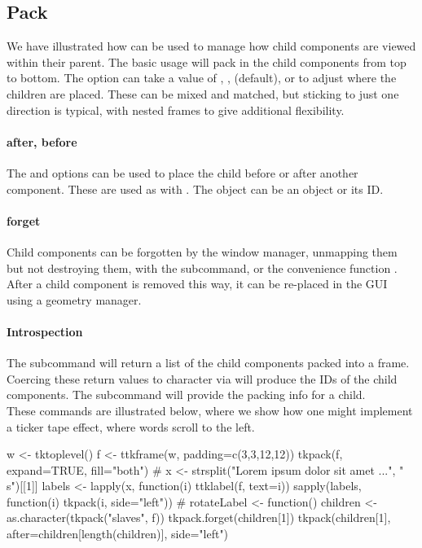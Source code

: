 \subsection{Pack}
\label{sec:tcltk:pack}


We have illustrated how  can be used to manage how
child components are viewed within their parent. The basic usage
 will pack in the child components from top to
bottom. The  option can take a value of
, ,  (default), or 
to adjust where the children are placed. These can be mixed and
matched, but sticking to just one direction is typical, with nested
frames to give additional flexibility.

\paragraph{after, before}
The  and  options can be
used to place the child before or after another component. These are
used as with . The object
 can be an \R\/ object or its ID. 


\paragraph{forget}
Child components can be forgotten by the window manager, unmapping
them but not destroying them, with the 
subcommand, or the convenience function
. After a child component is removed this way,
it can be re-placed in the GUI using a geometry manager. 

\paragraph{Introspection}
The subcommand  will return a list of the
child components packed into a frame. Coercing these return values to
character via  will produce the IDs of the child
components. The subcommand  will provide the
packing info for a child.
\\

These commands are illustrated below, where we show how one might
implement a ticker tape effect, where words scroll to the left.
\begin{Schunk}
\begin{Sinput}
 w <- tktoplevel()
 f <- ttkframe(w, padding=c(3,3,12,12))
 tkpack(f, expand=TRUE, fill="both")
 #
 x <- strsplit("Lorem ipsum dolor sit amet ...", "\\s")[[1]]
 labels <- lapply(x, function(i) ttklabel(f, text=i))
 sapply(labels, function(i) tkpack(i, side="left"))
 #
 rotateLabel <- function() {
   children <- as.character(tkpack("slaves", f))
   tkpack.forget(children[1])
   tkpack(children[1], after=children[length(children)], 
          side="left")
 }
\end{Sinput}
\end{Schunk}

